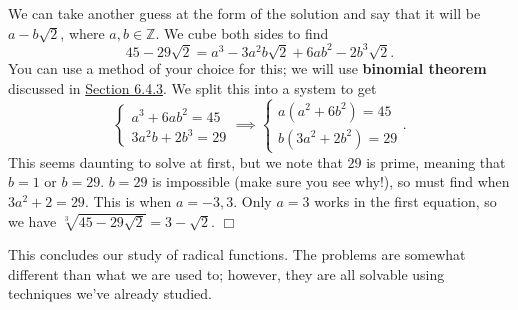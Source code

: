 \documentclass[lang=en,11pt]{elegantbook}
\begin{document}
\begin{solution}
We can take another guess at the form of the solution and say that it will be $a-b\sqrt{2}$, where $a,b\in\mathbb{Z}$.  We cube both sides to find $$45-29\sqrt{2}=a^3-3a^2b\sqrt{2}+6ab^2-2b^3\sqrt{2}.$$ You can use a method of your choice for this; we will use \textbf{binomial theorem} discussed in \hyperlink{section.6.4.3}{Section 6.4.3}. We split this into a system to get $$\begin{cases} a^3+6ab^2=45 \\ 3a^2b+2b^3=29 \end{cases} \implies \begin{cases} a(a^2+6b^2)=45 \\ b(3a^2+2b^2)=29\end{cases}.$$  This seems daunting to solve at first, but we note that $29$ is prime, meaning that $b=1$ or $b=29$.  $b=29$ is impossible (make sure you see why!), so must find when $3a^2+2=29$.  This is when $a=-3,3$.  Only $a=3$ works in the first equation, so we have $\sqrt[3]{45-29\sqrt{2}}=3-\sqrt{2}.$ $\Box$
\end{solution}
This concludes our study of radical functions.  The problems are somewhat different than what we are used to; however, they are all solvable using techniques we've already studied.
\end{document}
